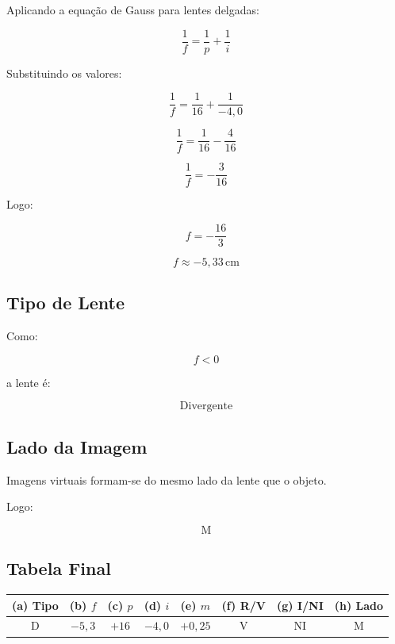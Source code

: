 \documentclass[12pt,a4paper]{article}
\begin{document}
Aplicando a equação de Gauss para lentes delgadas:

\[
\frac{1}{f}
=
\frac{1}{p}
+
\frac{1}{i}
\]

Substituindo os valores:

\[
\frac{1}{f}
=
\frac{1}{16}
+
\frac{1}{-4,0}
\]

\[
\frac{1}{f}
=
\frac{1}{16}
-
\frac{4}{16}
\]

\[
\frac{1}{f}
=
-\frac{3}{16}
\]

Logo:

\[
f = -\frac{16}{3}
\]

\[
f \approx -5,33\,\text{cm}
\]


\subsection*{Tipo de Lente}

Como:

\[
f < 0
\]

a lente é:

\[
\boxed{\text{Divergente}}
\]


\subsection*{Lado da Imagem}

Imagens virtuais formam-se do mesmo lado da lente que o objeto.

Logo:

\[
\boxed{\text{M}}
\]


\subsection*{Tabela Final}

\begin{center}
\begin{tabular}{cccccccc}
\hline

(a) Tipo & (b) $f$ & (c) $p$ & (d) $i$
& (e) $m$ & (f) R/V & (g) I/NI & (h) Lado \\

\hline

D & $-5,3$ & $+16$
& $-4,0$
& $+0,25$
& V
& NI
& M \\

\hline
\end{tabular}
\end{center}
\end{document}
